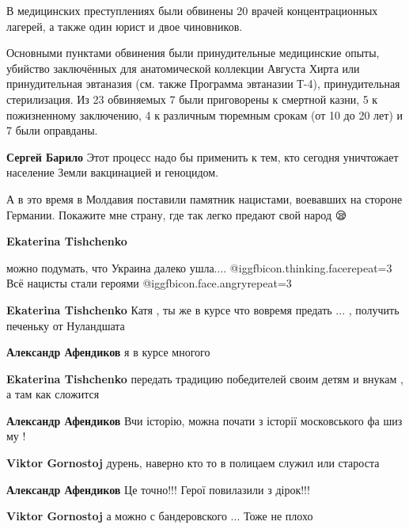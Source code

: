 \begin{itemize}
В медицинских преступлениях были обвинены 20 врачей концентрационных лагерей, а
также один юрист и двое чиновников.

Основными пунктами обвинения были принудительные медицинские опыты, убийство
заключённых для анатомической коллекции Августа Хирта или принудительная
эвтаназия (см. также Программа эвтаназии Т-4), принудительная стерилизация. Из
23 обвиняемых 7 были приговорены к смертной казни, 5 к пожизненному заключению,
4 к различным тюремным срокам (от 10 до 20 лет) и 7 были оправданы.

\begin{itemize} %
\textbf{Сергей Барило} Этот процесс надо бы применить к тем, кто сегодня уничтожает население Земли вакцинацией и геноцидом.
\end{itemize} %


А в это время в Молдавия поставили памятник нацистами, воевавших на стороне
Германии. Покажите мне страну, где так легко предают свой народ 😪

\begin{itemize} %
\textbf{Ekaterina Tishchenko} 

можно подумать, что Украина далеко ушла....
@igg{fbicon.thinking.face}{repeat=3} Всё нацисты стали героями
@igg{fbicon.face.angry}{repeat=3} 

\textbf{Ekaterina Tishchenko} Катя , ты же в курсе что вовремя предать ... , получить печеньку от Нуландшата

\begin{itemize} %
\textbf{Александр Афендиков} я в курсе многого

\textbf{Ekaterina Tishchenko} передать традицию победителей своим детям и внукам , а там как сложится

\textbf{Александр Афендиков} Вчи історію, можна почати з історії московського фа шиз му !

\textbf{Viktor Gornostoj} дурень, наверно кто то в полицаем служил или староста

\textbf{Александр Афендиков} Це точно!!! Герої повилазили з дірок!!!

\textbf{Viktor Gornostoj} а можно с бандеровского ... Тоже не плохо
\end{itemize} %


\end{itemize}
\end{itemize}
